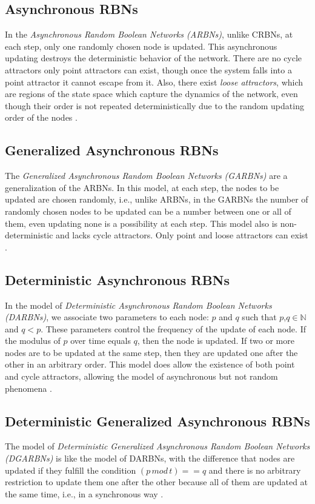 \subsection{Asynchronous RBNs}
In the \textit{Asynchronous  Random Boolean Networks (ARBNs)}, unlike CRBNs, at each step, only one randomly chosen node is updated. This asynchronous updating destroys the deterministic behavior of the network. There are no cycle attractors only point attractors can exist, though once the system falls into a point attractor it cannot escape from it. Also, there exist \textit{loose attractors}, which are regions of the state space which capture the dynamics of the network, even though their order is not repeated deterministically due to the random updating order of the nodes \cite{updating_scheme1}.

\subsection{Generalized Asynchronous RBNs}
The \textit{Generalized Asynchronous Random Boolean Networks (GARBNs)} are a generalization of the ARBNs. In this model, at each step, the nodes to be updated are chosen randomly, i.e., unlike ARBNs, in the GARBNs the number of randomly chosen nodes to be updated can be a number between one or all of them, even updating none is a possibility at each step. This model also is non-deterministic and lacks cycle attractors. Only point and loose attractors can exist \cite{updating_scheme2}.

\subsection{Deterministic Asynchronous RBNs}
In the model of \textit{Deterministic Asynchronous Random Boolean Networks (DARBNs)}, we associate two parameters to each node: $p$ and $q$ such that $p$,$q\in \mathbb{N}$ and $q<p$. These parameters control the frequency of the update of each node. If the modulus of $p$ over time equals $q$, then the node is updated. If two or more nodes are to be updated at the same step, then they are updated one after the other in an arbitrary order. This model does allow the existence of both point and cycle attractors, allowing the model of asynchronous but not random phenomena \cite{updating_scheme1}.

\subsection{Deterministic Generalized Asynchronous RBNs}
The model of \textit{Deterministic Generalized Asynchronous Random Boolean Networks (DGARBNs)} is like the model of DARBNs, with the difference that nodes are updated if they fulfill the condition $(p\,mod\,t)==q$ and there is no arbitrary restriction to update them one after the other because all of them are updated at the same time, i.e., in a synchronous way \cite{updating_scheme2}.

